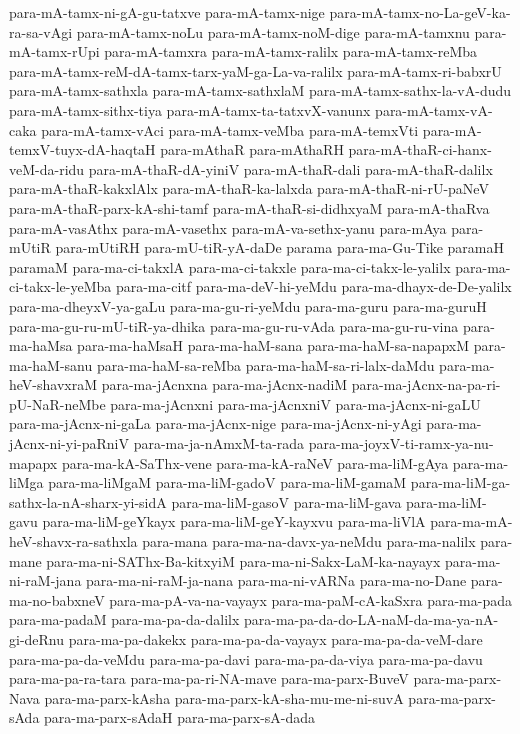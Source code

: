 {para-mA-tamx-ni-gA-gu-tatxve
para-mA-tamx-nige
para-mA-tamx-no-La-geV-ka-ra-sa-vAgi
para-mA-tamx-noLu
para-mA-tamx-noM-dige
para-mA-tamxnu
para-mA-tamx-rUpi
para-mA-tamxra
para-mA-tamx-ralilx
para-mA-tamx-reMba
para-mA-tamx-reM-dA-tamx-tarx-yaM-ga-La-va-ralilx
para-mA-tamx-ri-babxrU
para-mA-tamx-sathxla
para-mA-tamx-sathxlaM
para-mA-tamx-sathx-la-vA-dudu
para-mA-tamx-sithx-tiya
para-mA-tamx-ta-tatxvX-vanunx
para-mA-tamx-vA-caka
para-mA-tamx-vAci
para-mA-tamx-veMba
para-mA-temxVti
para-mA-temxV-tuyx-dA-haqtaH
para-mAthaR
para-mAthaRH
para-mA-thaR-ci-hanx-veM-da-ridu
para-mA-thaR-dA-yiniV
para-mA-thaR-dali
para-mA-thaR-dalilx
para-mA-thaR-kakxlAlx
para-mA-thaR-ka-lalxda
para-mA-thaR-ni-rU-paNeV
para-mA-thaR-parx-kA-shi-tamf
para-mA-thaR-si-didhxyaM
para-mA-thaRva
para-mA-vasAthx
para-mA-vasethx
para-mA-va-sethx-yanu
para-mAya
para-mUtiR
para-mUtiRH
para-mU-tiR-yA-daDe
parama
para-ma-Gu-Tike
paramaH
paramaM
para-ma-ci-takxlA
para-ma-ci-takxle
para-ma-ci-takx-le-yalilx
para-ma-ci-takx-le-yeMba
para-ma-citf
para-ma-deV-hi-yeMdu
para-ma-dhayx-de-De-yalilx
para-ma-dheyxV-ya-gaLu
para-ma-gu-ri-yeMdu
para-ma-guru
para-ma-guruH
para-ma-gu-ru-mU-tiR-ya-dhika
para-ma-gu-ru-vAda
para-ma-gu-ru-vina
para-ma-haMsa
para-ma-haMsaH
para-ma-haM-sana
para-ma-haM-sa-napapxM
para-ma-haM-sanu
para-ma-haM-sa-reMba
para-ma-haM-sa-ri-lalx-daMdu
para-ma-heV-shavxraM
para-ma-jAcnxna
para-ma-jAcnx-nadiM
para-ma-jAcnx-na-pa-ri-pU-NaR-neMbe
para-ma-jAcnxni
para-ma-jAcnxniV
para-ma-jAcnx-ni-gaLU
para-ma-jAcnx-ni-gaLa
para-ma-jAcnx-nige
para-ma-jAcnx-ni-yAgi
para-ma-jAcnx-ni-yi-paRniV
para-ma-ja-nAmxM-ta-rada
para-ma-joyxV-ti-ramx-ya-nu-mapapx
para-ma-kA-SaThx-vene
para-ma-kA-raNeV
para-ma-liM-gAya
para-ma-liMga
para-ma-liMgaM
para-ma-liM-gadoV
para-ma-liM-gamaM
para-ma-liM-ga-sathx-la-nA-sharx-yi-sidA
para-ma-liM-gasoV
para-ma-liM-gava
para-ma-liM-gavu
para-ma-liM-geYkayx
para-ma-liM-geY-kayxvu
para-ma-liVlA
para-ma-mA-heV-shavx-ra-sathxla
para-mana
para-ma-na-davx-ya-neMdu
para-ma-nalilx
para-mane
para-ma-ni-SAThx-Ba-kitxyiM
para-ma-ni-Sakx-LaM-ka-nayayx
para-ma-ni-raM-jana
para-ma-ni-raM-ja-nana
para-ma-ni-vARNa
para-ma-no-Dane
para-ma-no-babxneV
para-ma-pA-va-na-vayayx
para-ma-paM-cA-kaSxra
para-ma-pada
para-ma-padaM
para-ma-pa-da-dalilx
para-ma-pa-da-do-LA-naM-da-ma-ya-nA-gi-deRnu
para-ma-pa-dakekx
para-ma-pa-da-vayayx
para-ma-pa-da-veM-dare
para-ma-pa-da-veMdu
para-ma-pa-davi
para-ma-pa-da-viya
para-ma-pa-davu
para-ma-pa-ra-tara
para-ma-pa-ri-NA-mave
para-ma-parx-BuveV
para-ma-parx-Nava
para-ma-parx-kAsha
para-ma-parx-kA-sha-mu-me-ni-suvA
para-ma-parx-sAda
para-ma-parx-sAdaH
para-ma-parx-sA-dada
}
